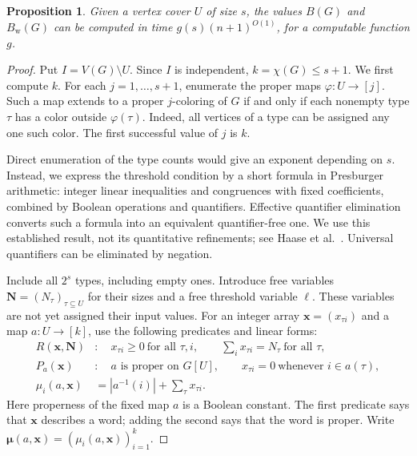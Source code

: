 \documentclass[11pt,reqno]{amsart}
\numberwithin{equation}{section}
\newtheorem{proposition}[theorem]{Proposition}
\theoremstyle{definition}
\theoremstyle{remark}
\begin{document}
\begin{proposition}\label{rec:cover}
Given a vertex cover $U$ of size $s$, the values $B(G)$ and $B_{\mathrm w}(G)$
can be computed in time $g(s)(n+1)^{O(1)}$, for a computable function $g$.
\end{proposition}
\begin{proof}
Put $I=V(G)\setminus U$. Since $I$ is independent,
$k=\chi(G)\leq s+1$. We first compute $k$. For each
$j=1,\ldots,s+1$, enumerate the proper maps $\varphi:U\to[j]$.
Such a map extends to a proper $j$-coloring of $G$ if and only if
each nonempty type $\tau$ has a color outside $\varphi(\tau)$.
Indeed, all vertices of a type can be assigned any one such color.
The first successful value of $j$ is $k$.

Direct enumeration of the type counts would give an exponent depending
on $s$. Instead, we express the threshold condition by a short formula
in Presburger arithmetic: integer linear inequalities and congruences
with fixed coefficients, combined by Boolean operations and quantifiers.
Effective quantifier elimination converts such a formula into an
equivalent quantifier-free one. We use this established result, not
its quantitative refinements; see Haase et al.~\cite[Corollary~3.2]{haase2024}.
Universal quantifiers can be eliminated by negation.

Include all $2^s$ types, including empty ones. Introduce free variables
$\mathbf N=(N_\tau)_{\tau\subseteq U}$ for their sizes and a free
threshold variable $\ell$. These variables are not yet assigned their
input values. For an integer array $\mathbf x=(x_{\tau i})$ and a
map $a:U\to[k]$, use the following predicates and linear forms:
\[
\begin{aligned}
R(\mathbf x,\mathbf N)
&:\quad x_{\tau i}\geq0\ \text{for all }\tau,i,\qquad
          \sum_i x_{\tau i}=N_\tau\ \text{for all }\tau,\\
P_a(\mathbf x)
&:\quad a\text{ is proper on }G[U],\qquad
          x_{\tau i}=0\ \text{whenever }i\in a(\tau),\\
\mu_i(a,\mathbf x)&=|a^{-1}(i)|+\sum_\tau x_{\tau i}.
\end{aligned}
\]
Here properness of the fixed map $a$ is a Boolean constant.
The first predicate says that $\mathbf x$ describes a word; adding
the second says that the word is proper. Write
$\boldsymbol\mu(a,\mathbf x)=(\mu_i(a,\mathbf x))_{i=1}^k$.


\end{proof}
\end{document}
